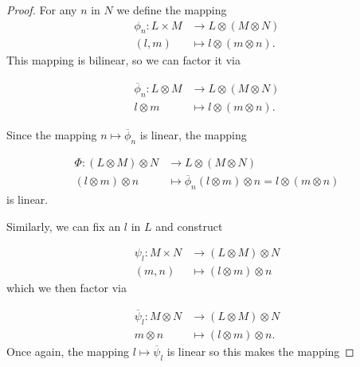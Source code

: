 \documentclass{report}
\theoremstyle{definition}
\theoremstyle{remark}
\begin{document}
\begin{proof}
For any $n$ in $N$ we define the mapping
\begin{equation*}
    \begin{split}
        \phi_n : L \times M & \to L \otimes (M \otimes N) \\
        (l,m) & \mapsto l \otimes (m \otimes n).
    \end{split}
\end{equation*}This mapping is bilinear, so we can factor it via 

\begin{equation*}
    \begin{split}
        \overline{\phi}_n : L \otimes M & \to L \otimes (M \otimes N) \\
        l \otimes m & \mapsto l \otimes (m \otimes n).
    \end{split}
\end{equation*}

Since the mapping $n \mapsto \overline{\phi}_n$ is linear, the mapping

\begin{equation*}
    \begin{split}
        \Phi : (L \otimes M) \otimes N & \to L \otimes ( M \otimes N) \\
        (l \otimes m) \otimes n & \mapsto \overline{\phi}_n(l\otimes m )\otimes n = l \otimes (m \otimes n)
    \end{split}
\end{equation*}is linear. 

Similarly, we can fix an $l$ in $L$ and construct 

\begin{equation*}
    \begin{split}
        \psi_l : M \times N & \to (L \otimes M) \otimes N \\
        (m,n) & \mapsto (l \otimes m) \otimes n
    \end{split}
\end{equation*} which we then factor via

\begin{equation*}
    \begin{split}
        \overline{\psi}_l : M \otimes N & \to (L \otimes M) \otimes N \\
        m \otimes n & \mapsto (l \otimes m ) \otimes n.
    \end{split}
\end{equation*}
Once again, the mapping $l \mapsto \overline{\psi}_l$ is linear so this makes the mapping 


\end{proof}
\end{document}
